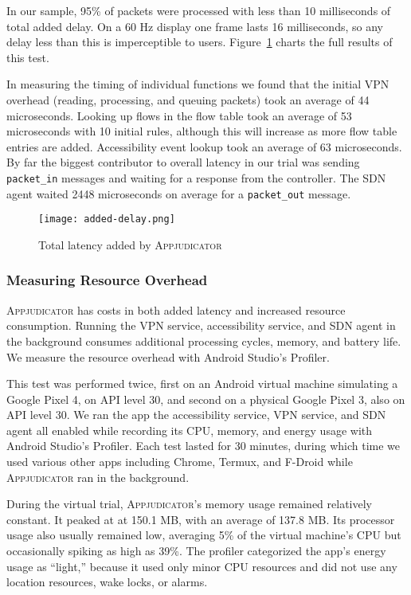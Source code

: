In our sample, 95\% of packets were processed with less than 10 milliseconds
of total added delay. On a 60 Hz display one frame lasts 16 milliseconds, so any
delay less than this is imperceptible to users.
Figure~\ref{fig:added-delay-chart} charts the full results of this test.

In measuring the timing of individual functions we found that the initial VPN
overhead (reading, processing, and queuing packets) took an average of 44
microseconds. Looking up flows in the flow table took an average of 53
microseconds with 10 initial rules, although this will increase as more flow
table entries are added. Accessibility event lookup took an average of 63
microseconds. By far the biggest contributor to overall latency in our trial was
sending \texttt{packet\_in} messages and waiting for a response from the
controller. The SDN agent waited 2448 microseconds on average for a
\texttt{packet\_out} message.

\begin{figure}[h]
    \centering
	\texttt{[image: added-delay.png]}
	\caption{Total latency added by \textsc{Appjudicator}}
	\label{fig:added-delay-chart}
\end{figure}

\subsubsection{Measuring Resource Overhead}
\label{sec:measuring-resource-overhead}

\textsc{Appjudicator} has costs in both added latency and increased resource
consumption. Running the VPN service, accessibility service, and SDN agent in
the background consumes additional processing cycles, memory, and battery life.
We measure the resource overhead with Android Studio's
Profiler.~\cite{androidprofiler}

This test was performed twice, first on an Android virtual machine simulating a
Google Pixel 4, on API level 30, and second on a physical Google Pixel 3, also
on API level 30. We ran the app the accessibility service, VPN service, and SDN
agent all enabled while recording its CPU, memory, and energy usage with Android
Studio's Profiler. Each test lasted for 30 minutes, during which time we used
various other apps including Chrome, Termux, and F-Droid while
\textsc{Appjudicator} ran in the background.

During the virtual trial, \textsc{Appjudicator}'s memory usage remained
relatively constant. It peaked at at 150.1 MB, with an average of 137.8 MB. Its
processor usage also usually remained low, averaging 5\% of the virtual
machine's CPU but occasionally spiking as high as 39\%. The profiler categorized
the app's energy usage as ``light,'' because it used only minor CPU resources
and did not use any location resources, wake locks, or alarms.

